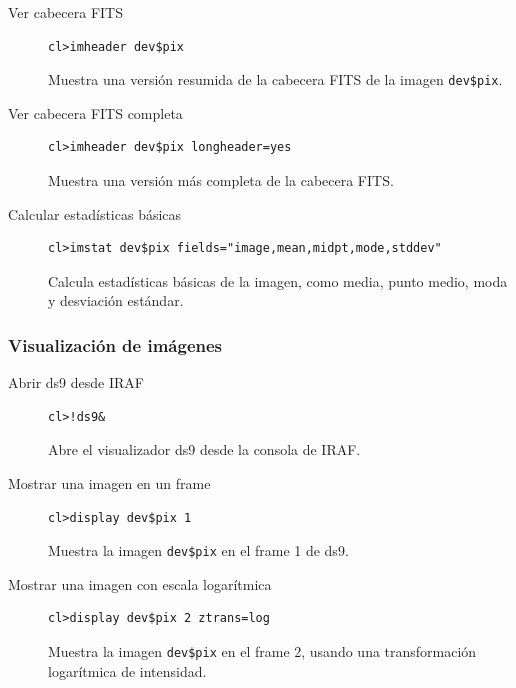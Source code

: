\begin{description}

\item[Ver cabecera FITS]
\begin{verbatim}
cl>imheader dev$pix
\end{verbatim}
Muestra una versión resumida de la cabecera FITS de la imagen \texttt{dev\$pix}.

\item[Ver cabecera FITS completa]
\begin{verbatim}
cl>imheader dev$pix longheader=yes
\end{verbatim}
Muestra una versión más completa de la cabecera FITS.

\item[Calcular estadísticas básicas]
\begin{verbatim}
cl>imstat dev$pix fields="image,mean,midpt,mode,stddev"
\end{verbatim}
Calcula estadísticas básicas de la imagen, como media, punto medio, moda y desviación estándar.

\end{description}

\subsubsection*{Visualización de imágenes}

\begin{description}

\item[Abrir ds9 desde IRAF]
\begin{verbatim}
cl>!ds9&
\end{verbatim}
Abre el visualizador ds9 desde la consola de IRAF.

\item[Mostrar una imagen en un frame]
\begin{verbatim}
cl>display dev$pix 1
\end{verbatim}
Muestra la imagen \texttt{dev\$pix} en el frame 1 de ds9.

\item[Mostrar una imagen con escala logarítmica]
\begin{verbatim}
cl>display dev$pix 2 ztrans=log
\end{verbatim}
Muestra la imagen \texttt{dev\$pix} en el frame 2, usando una transformación logarítmica de intensidad.

\end{description}

